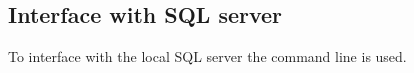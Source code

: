 \subsection{Interface with SQL server}
To interface with the local \ac{SQL} server the command line is used.